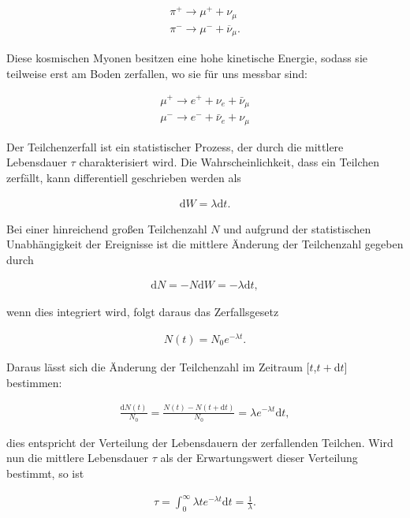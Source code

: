 \begin{align*}
	\pi^+ \rightarrow \mu^+ + \nu_\mu\\	
	\pi^- \rightarrow \mu^- + \overline{\nu}_\mu.
\end{align*}

Diese kosmischen Myonen besitzen eine hohe kinetische Energie, sodass sie teilweise erst am Boden zerfallen, wo sie f\"ur uns messbar sind:

\begin{align*}
	\mu^+ \rightarrow e^+ + \nu_e + \bar{\nu}_\mu\\
	\mu^- \rightarrow e^- + \bar{\nu}_e + \nu_\mu
\end{align*}

Der Teilchenzerfall ist ein statistischer Prozess, der durch die mittlere Lebensdauer $\tau$ charakterisiert wird. Die Wahrscheinlichkeit, dass ein Teilchen zerf\"allt, kann differentiell geschrieben werden als

\begin{align}
	\text{d}W = \lambda \text{d}t.
\end{align}

Bei einer hinreichend gro{\ss}en Teilchenzahl $N$ und aufgrund der statistischen Unabhängigkeit der Ereignisse ist die mittlere \"Anderung der Teilchenzahl gegeben durch

\begin{align*}
	\text{d}N = - N \text{d}W = - \lambda \text{d}t,
\end{align*}

wenn dies integriert wird, folgt daraus das Zerfallsgesetz

\begin{align}
	N(t) = N_0 e^{-\lambda t}.
	\label{eq:zerfallsgesetz}
\end{align}

Daraus l\"asst sich die \"Anderung der Teilchenzahl im Zeitraum [$t$,$t+$d$t$] bestimmen:

\begin{align}
	\frac{\text{d}N(t)}{N_0} = \frac{N(t)-N(t+\text{d}t)}{N_0} = \lambda e^{-\lambda t}\text{d}t,
	\label{eq:lebensdauer}
\end{align}

dies entspricht der Verteilung der Lebensdauern der zerfallenden Teilchen. Wird nun die mittlere Lebensdauer $\tau$ als der Erwartungswert dieser Verteilung bestimmt, so ist

\begin{align}
	\tau = \int_{0}^{\infty} \lambda t e^{-\lambda t}\text{d}t = \frac{1}{\lambda}.
\end{align}

